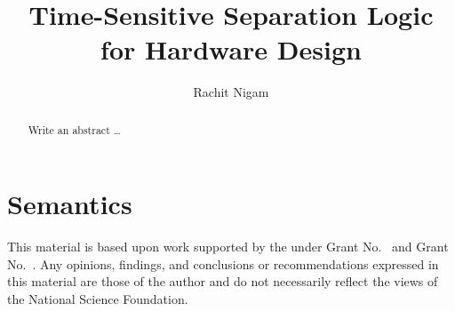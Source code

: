 \documentclass[acmsmall,review,anonymous]{acmart}
\begin{document}
\title{Time-Sensitive Separation Logic for Hardware Design}


\author{Rachit Nigam}

\begin{abstract}
Write an abstract \ldots
\end{abstract}

\maketitle

\section{Semantics}


\ottdefncheck


\begin{acks}
  This material is based upon work supported by the
   under Grant
  No.~ and Grant
  No.~.  Any opinions, findings, and
  conclusions or recommendations expressed in this material are those
  of the author and do not necessarily reflect the views of the
  National Science Foundation.
\end{acks}


% 
\end{document}
